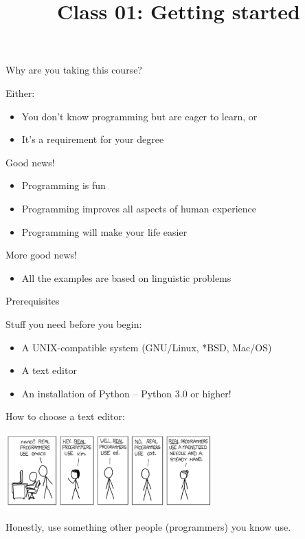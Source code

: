 \documentclass[10pt, compress]{beamer}
\title{Class 01: Getting started }
\begin{document}
\maketitle

\begin{frame}{Why are you taking this course?}

Either:
\begin{itemize}
  \item You don't know programming but are eager to learn, or
  \item It's a requirement for your degree
\end{itemize}

Good news!
\begin{itemize}
  \item Programming is fun
  \item Programming improves all aspects of human experience
  \item Programming will make your life easier
\end{itemize}

More good news! 
\begin{itemize}
  \item All the examples are based on linguistic problems
\end{itemize}

\end{frame}

\begin{frame}{Prerequisites}

Stuff you need before you begin:
\begin{itemize}
 \item A UNIX-compatible system (GNU/Linux, *BSD, Mac/OS)
 \item A text editor
 \item An installation of Python -- Python 3.0 or higher!
\end{itemize}

How to choose a text editor:

\begin{center}
  \includegraphics[width=0.6\textwidth]{graphics/realprogrammers.png}
\end{center}

Honestly, use something other people (programmers) you know use.

\end{frame}
\end{document}
